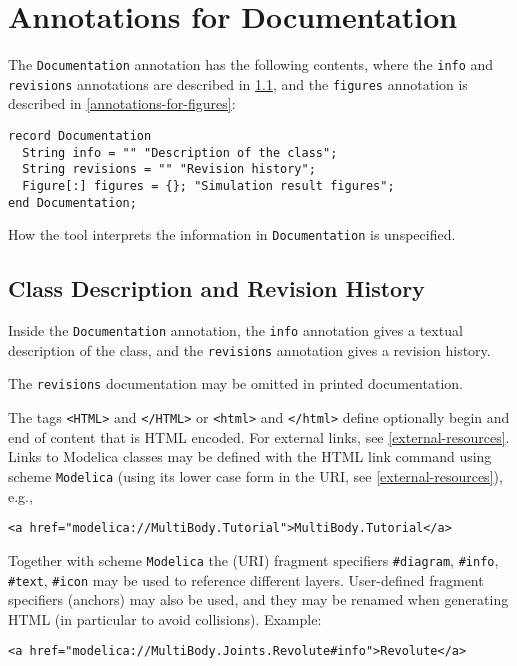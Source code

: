 \section{Annotations for Documentation}\label{annotations-for-documentation}

The \lstinline!Documentation! annotation has the following contents, where the \lstinline!info! and \lstinline!revisions! annotations are described in \cref{annotation-info-revisions},
and the \lstinline!figures! annotation is described in \cref{annotations-for-figures}:
\begin{lstlisting}[language=modelica]
record Documentation
  String info = "" "Description of the class";
  String revisions = "" "Revision history";
  Figure[:] figures = {}; "Simulation result figures";
end Documentation;
\end{lstlisting}

How the tool interprets the information in \lstinline!Documentation! is unspecified.

\subsection{Class Description and Revision History}\label{annotation-info-revisions}

Inside the \lstinline!Documentation! annotation, the \lstinline!info! annotation gives a textual description of the class, and the \lstinline!revisions! annotation gives a revision history.

\begin{nonnormative}
The \lstinline!revisions! documentation may be omitted in printed documentation.
\end{nonnormative}

The tags \lstinline!<HTML>! and \lstinline!</HTML>! or \lstinline!<html>! and \lstinline!</html>! define optionally begin and end of content that is HTML encoded.  For external links,
see \cref{external-resources}.  Links to Modelica classes may be defined with the HTML link command using scheme \lstinline!Modelica! (using its lower case form in the URI, see
\cref{external-resources}), e.g.,
\begin{lstlisting}[language=modelica]
<a href="modelica://MultiBody.Tutorial">MultiBody.Tutorial</a>
\end{lstlisting}

Together with scheme \lstinline!Modelica! the (URI) fragment specifiers
\lstinline!#diagram!, \lstinline!#info!, \lstinline!#text!, \lstinline!#icon! may be used to reference different
layers. User-defined fragment specifiers (anchors) may also be used, and they may be renamed
when generating HTML (in particular to avoid collisions).
Example:
\begin{lstlisting}[language=modelica]
<a href="modelica://MultiBody.Joints.Revolute#info">Revolute</a>
\end{lstlisting}

